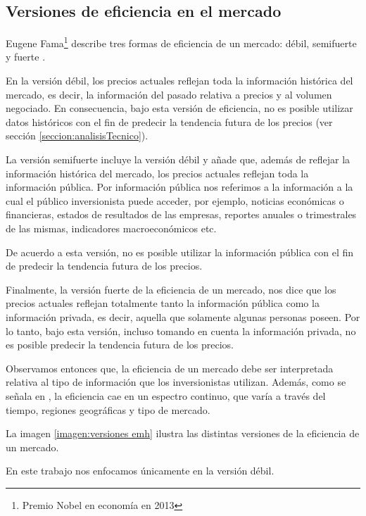 \documentclass[12pt]{scrbook}
\theoremstyle{break}
\theoremstyle{break}
\begin{document}
\subsection{Versiones de eficiencia en el mercado}
\label{subseccion:versiones emh}
Eugene Fama\footnote{Premio Nobel en economía en 2013} describe tres formas de eficiencia de un mercado: débil, semifuerte y fuerte \cite{Fama1965}.

En la versión débil, los precios actuales reflejan toda la información histórica del mercado, es decir, la información del pasado relativa a precios y al volumen negociado. En consecuencia, bajo esta versión de eficiencia, no es posible utilizar datos históricos con el fin de predecir la tendencia futura de los precios (ver sección \ref{seccion:analisisTecnico}).

La versión semifuerte incluye la versión débil y añade que, además de reflejar la información histórica del mercado, los precios actuales reflejan toda la información pública. Por información pública nos referimos a la información a la cual el público inversionista puede acceder, por ejemplo, noticias económicas o financieras, estados de resultados de las empresas, reportes anuales o trimestrales de las mismas, indicadores macroeconómicos etc.

De acuerdo a esta versión, no es posible utilizar la información pública con el fin de predecir la tendencia futura de los precios.

Finalmente, la versión fuerte de la eficiencia de un mercado, nos dice que los precios actuales reflejan totalmente tanto la información pública como la información privada, es decir, aquella que solamente algunas personas poseen. Por lo tanto, bajo esta versión, incluso tomando en cuenta la información privada, no es posible predecir la tendencia futura de los precios.

Observamos entonces que, la eficiencia de un mercado debe ser interpretada relativa al tipo de información que los inversionistas utilizan. Además, como se señala en \cite{CFA2019}, la eficiencia cae en un espectro continuo, que varía a través del tiempo, regiones geográficas y tipo de mercado.

La imagen \ref{imagen:versiones emh} ilustra las distintas versiones de la eficiencia de un mercado.

En este trabajo nos enfocamos únicamente en la versión débil.
\end{document}

